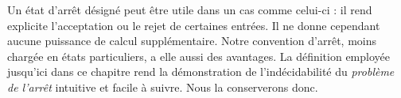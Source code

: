 \documentclass[../../../include/open-logic-section]{subfiles}
\begin{document}
\begin{explain}
Un état d'arrêt désigné peut être utile dans un cas comme
celui-ci : il rend explicite l'acceptation ou le rejet de
certaines entrées. Il ne donne cependant aucune puissance
de calcul supplémentaire. Notre convention d'arrêt, moins
chargée en états particuliers, a elle aussi des avantages.
La définition employée jusqu'ici dans ce chapitre rend
la démonstration de l'indécidabilité du \emph{problème de l'arrêt} intuitive
et facile à suivre. Nous la conserverons donc.
\end{explain}
\end{document}
